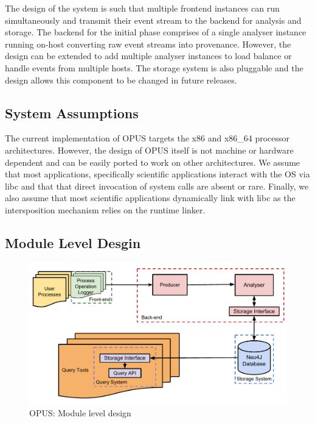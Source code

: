 \documentclass[withindex,glossary]{cam-thesis}
\begin{document}
The design of the system is such that multiple frontend instances can run simultaneously and transmit their event stream to the backend for analysis and storage.
The backend for the initial phase comprises of a single analyser instance running on-host converting raw event streams into provenance.
However, the design can be extended to add multiple analyser instances to load balance or handle events from multiple hosts.
The storage system is also pluggable and the design allows this component to be changed in future releases.

\subsection{System Assumptions}
The current implementation of OPUS targets the x86 and x86\_64 processor architectures.
However, the design of OPUS itself is not machine or hardware dependent and can be easily ported to work on other architectures.
We assume that most applications, specifically scientific applications interact with the OS via libc and that that direct invocation of system calls are absent or rare.
Finally, we also assume that most scientific applications dynamically link with libc as the intersposition mechanism relies on the runtime linker.

\subsection{Module Level Desgin}

\begin{figure}[t!]
  \centering
    \includegraphics[width=1.0\columnwidth]{ProvDesign}
  \caption{OPUS: Module level design}
  \label{fig:opuslld}
\end{figure}
\end{document}
